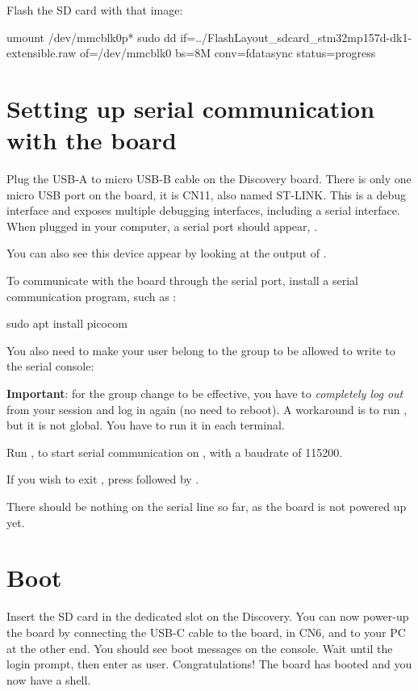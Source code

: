 Flash the SD card with that image:
\begin{bashinput}
umount /dev/mmcblk0p*
sudo dd if=../FlashLayout_sdcard_stm32mp157d-dk1-extensible.raw of=/dev/mmcblk0 bs=8M conv=fdatasync status=progress
\end{bashinput}

\section{Setting up serial communication with the board}

Plug the USB-A to micro USB-B cable on the Discovery board. There is
only one micro USB port on the board, it is CN11, also named ST-LINK.
This is a debug interface and exposes multiple debugging interfaces,
including a serial interface. When plugged in your computer, a serial
port should appear, .

You can also see this device appear by looking at the output of
.

To communicate with the board through the serial port, install a
serial communication program, such as :

\begin{bashinput}
sudo apt install picocom
\end{bashinput}

You also need to make your user belong to the  group to be
allowed to write to the serial console:


{\bf Important}: for the group change to be effective, you have to
{\em completely log out} from your session and log in again (no need to
reboot). A workaround is to run , but it is not global.
You have to run it in each terminal.

Run , to start serial
communication on , with a baudrate of 115200.

If you wish to exit , press \code{[Ctrl][a]} followed by
\code{[Ctrl][x]}.

There should be nothing on the serial line so far, as the board is not
powered up yet.

\section{Boot}

Insert the SD card in the dedicated slot on the Discovery.  You can
now power-up the board by connecting the USB-C cable to the board, in
CN6,  and to your PC at the other end.  You should see
boot messages on the console. Wait until the login prompt, then enter
 as user.  Congratulations! The board has booted and you
now have a shell.


